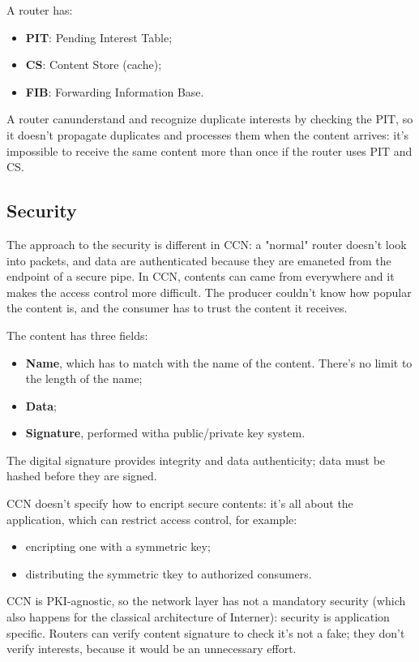 A router has:
\begin{itemize}
  \item \textbf{PIT}: Pending Interest Table;
  \item \textbf{CS}: Content Store (cache);
  \item \textbf{FIB}: Forwarding Information Base.
\end{itemize}

A router canunderstand and recognize duplicate interests by checking the PIT, so it doesn't propagate duplicates and processes them when the content arrives: it's impossible to receive the same content more than once if the router uses PIT and CS.

\subsection{Security}
The approach to the security is different in CCN: a "normal" router doesn't look into packets, and data are authenticated because they are emaneted from the endpoint of a secure pipe. In CCN, contents can came from everywhere and it makes the access control more difficult. The producer couldn't know how popular the content is, and the consumer has to trust the content it receives.

The content has three fields:
\begin{itemize}
  \item \textbf{Name}, which has to match with the name of the content. There's no limit to the length of the name;
  \item \textbf{Data};
  \item \textbf{Signature}, performed witha  public/private key system.
\end{itemize}
The digital signature provides integrity and data authenticity; data must be hashed before they are signed.

CCN doesn't specify how to encript secure contents: it's all about the application, which can restrict access control, for example:
\begin{itemize}
  \item encripting one with a symmetric key;
  \item distributing the symmetric tkey to authorized consumers.
\end{itemize}
CCN is PKI-agnostic, so the network layer has not a mandatory security (which also happens for the classical architecture of Interner): security is application specific. Routers can verify content signature to check it's not a fake; they don't verify interests, because it would be an unnecessary effort.

